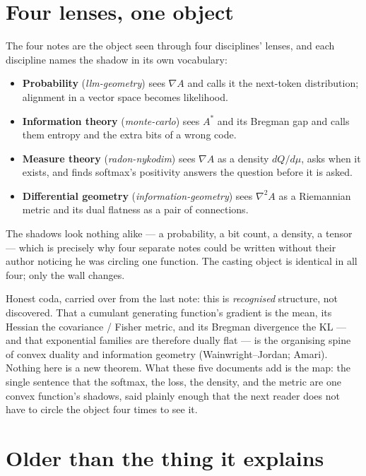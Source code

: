 \documentclass[11pt]{article}
\begin{document}
\section{Four lenses, one object}

The four notes are the object seen through four disciplines' lenses, and each discipline
names the shadow in its own vocabulary:
\begin{itemize}[leftmargin=1.5em]
  \item \textbf{Probability} (\emph{llm-geometry}) sees $\nabla A$ and calls it the next-token
  distribution; alignment in a vector space becomes likelihood.
  \item \textbf{Information theory} (\emph{monte-carlo}) sees $A^{*}$ and its Bregman gap and
  calls them entropy and the extra bits of a wrong code.
  \item \textbf{Measure theory} (\emph{radon-nykodim}) sees $\nabla A$ as a density $dQ/d\mu$,
  asks when it exists, and finds softmax's positivity answers the question before it is asked.
  \item \textbf{Differential geometry} (\emph{information-geometry}) sees $\nabla^2 A$ as a
  Riemannian metric and its dual flatness as a pair of connections.
\end{itemize}
The shadows look nothing alike --- a probability, a bit count, a density, a tensor --- which is
precisely why four separate notes could be written without their author noticing he was circling
one function. The casting object is identical in all four; only the wall changes.

\begin{insight}
Honest coda, carried over from the last note: this is \emph{recognised} structure, not
discovered. That a cumulant generating function's gradient is the mean, its Hessian the
covariance / Fisher metric, and its Bregman divergence the KL --- and that exponential families
are therefore dually flat --- is the organising spine of convex duality and information
geometry (Wainwright--Jordan; Amari). Nothing here is a new theorem. What these five documents
add is the map: the single sentence that the softmax, the loss, the density, and the metric are
one convex function's shadows, said plainly enough that the next reader does not have to circle
the object four times to see it.
\end{insight}

\section{Older than the thing it explains}
\end{document}
